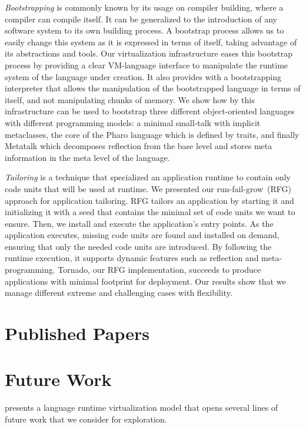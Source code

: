 \emph{Bootstrapping} is commonly known by its usage on compiler building, where a compiler can compile itself.
It can be generalized to the introduction of any software system to its own building process.
A bootstrap process allows us to easily change this system as it is expressed in terms of itself, taking advantage of its abstractions and tools.
Our virtualization infrastructure eases this bootstrap process by providing a clear VM-language interface to manipulate the runtime system of the language under creation. It also provides with a bootstrapping interpreter that allows the manipulation of the bootstrapped language in terms of itself, and not manipulating chunks of memory.
We show how by this infrastructure can be used to bootstrap three different object-oriented languages with different programming models: a minimal small-talk with implicit metaclasses, the core of the Pharo language which is defined by traits, and finally Metatalk which decomposes reflection from the base level and stores meta information in the meta level of the language.

\emph{Tailoring} is a technique that specialized an application runtime to contain only code units that will be used at runtime. We presented our run-fail-grow~(RFG) approach for application tailoring. RFG tailors an application by starting it and initializing it with a seed that contains the minimal set of code units we want to ensure. Then, we install and execute the application's entry points. As the application executes, missing code units are found and installed on demand, ensuring that only the needed code units are introduced. By following the runtime execution, it supports dynamic features such as reflection and meta-programming. Tornado, our RFG implementation, succeeds to produce applications with minimal footprint for deployment. Our results show that we manage different extreme and challenging cases with flexibility.

\section{Published Papers}

\section{Future Work}

\Vtt presents a language runtime virtualization model that opens several lines of future work that we consider for exploration.

